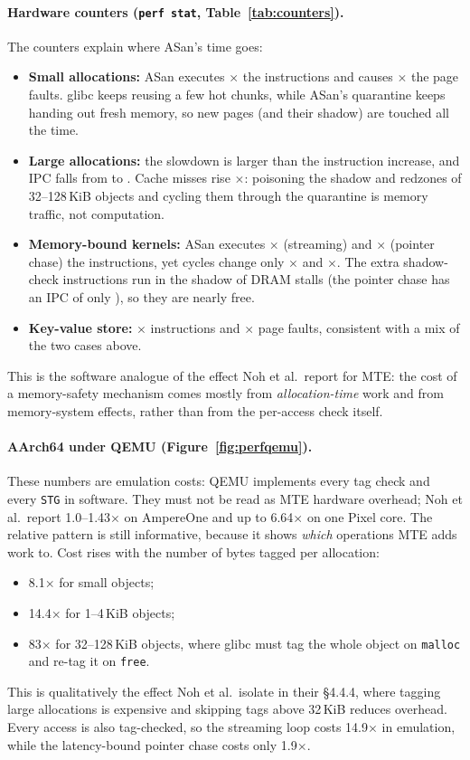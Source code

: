 \documentclass[11pt,a4paper]{article}
\begin{document}
\paragraph{Hardware counters (\texttt{perf stat}, Table~\ref{tab:counters}).}
The counters explain where ASan's time goes:
\begin{itemize}[itemsep=1pt]
\item \textbf{Small allocations:} ASan executes \AsanSmallInstr$\times$ the instructions and causes \AsanSmallPf$\times$ the page faults.
glibc keeps reusing a few hot chunks, while ASan's quarantine keeps handing out fresh memory, so new pages (and their shadow) are touched all the time.
\item \textbf{Large allocations:} the slowdown is larger than the instruction increase, and IPC falls from \BaseLargeIpc{} to \AsanLargeIpc.
Cache misses rise \AsanLargeMiss$\times$: poisoning the shadow and redzones of 32--128\,KiB objects and cycling them through the quarantine is memory traffic, not computation.
\item \textbf{Memory-bound kernels:} ASan executes \AsanSeqInstr$\times$ (streaming) and \AsanRandInstr$\times$ (pointer chase) the instructions, yet cycles change only \AsanSeqCyc$\times$ and \AsanRandCyc$\times$.
The extra shadow-check instructions run in the shadow of DRAM stalls (the pointer chase has an IPC of only \BaseRandIpc), so they are nearly free.
\item \textbf{Key-value store:} \AsanKvInstr$\times$ instructions and \AsanKvPf$\times$ page faults, consistent with a mix of the two cases above.
\end{itemize}
This is the software analogue of the effect Noh et al.\ report for MTE: the cost of a memory-safety mechanism comes mostly from \emph{allocation-time} work and from memory-system effects, rather than from the per-access check itself.

\paragraph{AArch64 under QEMU (Figure~\ref{fig:perfqemu}).}
These numbers are emulation costs: QEMU implements every tag check and every \texttt{STG} in software.
They must not be read as MTE hardware overhead; Noh et al.\ report 1.0--1.43$\times$ on AmpereOne and up to 6.64$\times$ on one Pixel core.
The relative pattern is still informative, because it shows \emph{which} operations MTE adds work to.
Cost rises with the number of bytes tagged per allocation:
\begin{itemize}[itemsep=1pt]
\item 8.1$\times$ for small objects;
\item 14.4$\times$ for 1--4\,KiB objects;
\item 83$\times$ for 32--128\,KiB objects, where glibc must tag the whole object on \texttt{malloc} and re-tag it on \texttt{free}.
\end{itemize}
This is qualitatively the effect Noh et al.\ isolate in their \S4.4.4, where tagging large allocations is expensive and skipping tags above 32\,KiB reduces overhead.
Every access is also tag-checked, so the streaming loop costs 14.9$\times$ in emulation, while the latency-bound pointer chase costs only 1.9$\times$.
\end{document}
